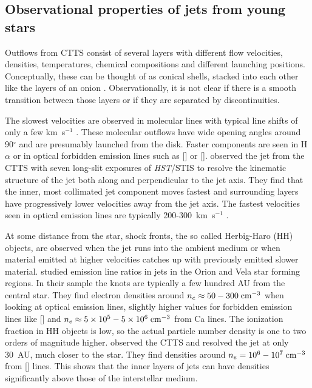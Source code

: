 \subsection{Observational properties of jets from young stars}

Outflows from CTTS consist of several layers with different flow velocities, densities, temperatures, chemical compositions and different launching positions. Conceptually, these can be thought of as conical shells, stacked into each other like the layers of an onion \citep{2000ApJ...537L..49B}. Observationally, it is not clear if there is a smooth transition between those layers or if they are separated by discontinuities. 

The slowest velocities are observed in molecular lines with typical line shifts of only a few km~s$^{-1}$ \citep{2008ApJ...676..472B}. These molecular outflows have wide opening angles around 90$^{\circ}$ \citep[e.g.][]{2013A&A...557A.110S,2014A&A...564A..11A} and are presumably launched from the disk. Faster components are seen in H$\alpha$ or in optical forbidden emission lines such as [] or []. \citet{2000ApJ...537L..49B} observed the jet from the CTTS  with seven long-slit exposures of \emph{HST}/STIS to resolve the kinematic structure of the jet both along and perpendicular to the jet axis. They find that the inner, most collimated jet component moves fastest and surrounding layers have progressively lower velocities away from the jet axis. The fastest velocities seen in optical emission lines are typically 200-300~km~s$^{-1}$ \citep{2004Ap&SS.292..651B,2008ApJ...689.1112C,2013A&A...550L...1S}.

At some distance from the star, shock fronts, the so called Herbig-Haro (HH) objects, are observed when the jet runs into the ambient medium or when material emitted at higher velocities catches up with previously emitted slower material. \citet{2006A&A...456..189P} studied emission line ratios in jets in the Orion and Vela star forming regions. In their sample the knots are typically a few hundred AU from the central star. They find electron densities around $n_e \approx 50-300 \textrm{\;cm}^{-3}$ when looking at optical emission lines, slightly higher values for forbidden emission lines like [] and $n_e \approx 5\times10^5-5\times10^6 \textrm{\;cm}^{-3}$ from Ca lines. The ionization fraction in HH objects is low, so the actual particle number density is one to two orders of magnitude higher. \citet{2004ApJ...609..261H} observed the CTTS  and resolved the jet at only 30~AU, much closer to the star. They find densities around $n_e=10^6-10^7\textrm{\;cm}^{-3}$ from [] lines. This shows that the inner layers of jets can have densities significantly above those of the interstellar medium.